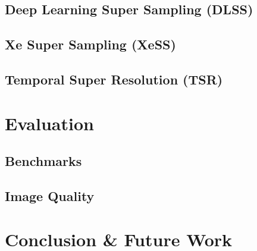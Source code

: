 \documentclass[letterpaper, 10 pt, conference]{ieeeconf}  %
\begin{document}
\subsection{Deep Learning Super Sampling (DLSS)}
\subsection{Xe Super Sampling (XeSS)}
\subsection{Temporal Super Resolution (TSR)}

\section{Evaluation}
\label{Sec:Evaluation}
\subsection{Benchmarks}
\subsection{Image Quality}

\section{Conclusion \& Future Work}
\label{Sec:ConcFuture}











\printbibliography[
title={Papers},
notkeyword=game, notkeyword=online
]
\end{document}
